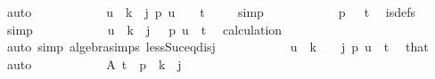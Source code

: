 \begin{isabellebody}
\ auto\isanewline
\ \ \ \ \ \ \ \ \isamarkupfalse%
\ \isamarkupfalse%
\ {\isachardoublequoteopen}{\isasymforall}u\ {\isacharless}{\kern0pt}\ k\ {\isacharminus}{\kern0pt}\ j{\isachardot}{\kern0pt}\ p\ {\isacharparenleft}{\kern0pt}u\ {\isacharplus}{\kern0pt}\ {}{\isacharparenright}{\kern0pt}\ {\isasymnoteq}\ t{\isachardoublequoteclose}\ \isamarkupfalse%
\ {\isacharasterisk}{\kern0pt}{\isacharasterisk}{\kern0pt}\ \isamarkupfalse%
\ simp\isanewline
\ \ \ \ \ \ \ \ \isamarkupfalse%
\ \isamarkupfalse%
\ {\isachardoublequoteopen}p\ {}\ {\isasymnoteq}\ t{\isachardoublequoteclose}\ \isamarkupfalse%
\ is{\isacharunderscore}{\kern0pt}defs\ {\isacharasterisk}{\kern0pt}{\isacharasterisk}{\kern0pt}\ \isamarkupfalse%
\ simp\isanewline
\ \ \ \ \ \ \ \ \isamarkupfalse%
\ \isamarkupfalse%
\ {\isachardoublequoteopen}{\isasymforall}u\ {\isacharless}{\kern0pt}\ k\ {\isacharminus}{\kern0pt}\ j\ {\isacharplus}{\kern0pt}\ {}{\isachardot}{\kern0pt}\ p\ u\ {\isasymnoteq}\ t{\isachardoublequoteclose}\ \isamarkupfalse%
\ calculation\ \isamarkupfalse%
\ {\isacharparenleft}{\kern0pt}auto\ simp{\isacharcolon}{\kern0pt}\ algebra{\isacharunderscore}{\kern0pt}simps\ less{\isacharunderscore}{\kern0pt}Suc{\isacharunderscore}{\kern0pt}eq{\isacharunderscore}{\kern0pt}{}{\isacharunderscore}{\kern0pt}disj{\isacharparenright}{\kern0pt}\isanewline
\ \ \ \ \ \ \ \ \isamarkupfalse%
\ \isamarkupfalse%
\ {\isachardoublequoteopen}{\isasymforall}u\ {\isacharless}{\kern0pt}\ {\isacharparenleft}{\kern0pt}k\ {\isacharplus}{\kern0pt}\ {}{\isacharparenright}{\kern0pt}\ {\isacharminus}{\kern0pt}\ j{\isachardot}{\kern0pt}\ p\ u\ {\isasymnoteq}\ t{\isachardoublequoteclose}\ \isamarkupfalse%
\ that\ \isamarkupfalse%
\ auto\isanewline
\ \ \ \ \ \ \ \ \isamarkupfalse%
\ \isamarkupfalse%
\ A{}{\isacharcolon}{\kern0pt}\ {\isachardoublequoteopen}t\ {\isasymnotin}\ p\ {\isacharbackquote}{\kern0pt}\ {\isacharbraceleft}{\kern0pt}{\isachardot}{\kern0pt}{\isachardot}{\kern0pt}{\isacharless}{\kern0pt}{\isacharparenleft}{\kern0pt}{\isacharparenleft}{\kern0pt}k{\isacharplus}{\kern0pt}{}{\isacharparenright}{\kern0pt}\ {\isacharminus}{\kern0pt}\ j{\isacharparenright}{\kern0pt}{\isacharbraceright}{\kern0pt}{\isachardoublequoteclose}\ \isamarkupfalse%

\end{isabellebody}
